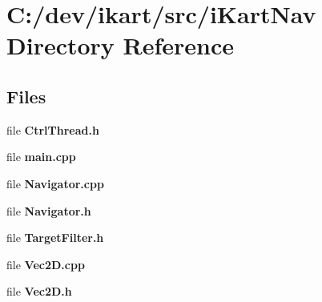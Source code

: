 \section{C\+:/dev/ikart/src/i\+Kart\+Nav Directory Reference}
\label{dir_b26c74f12371d83fa8a0742d7e10dc7b}
\subsection*{Files}
\begin{DoxyCompactItemize}
\item 
file {\bfseries Ctrl\+Thread.\+h}
\item 
file {\bfseries main.\+cpp}
\item 
file {\bfseries Navigator.\+cpp}
\item 
file {\bfseries Navigator.\+h}
\item 
file {\bfseries Target\+Filter.\+h}
\item 
file {\bfseries Vec2\+D.\+cpp}
\item 
file {\bfseries Vec2\+D.\+h}
\end{DoxyCompactItemize}
